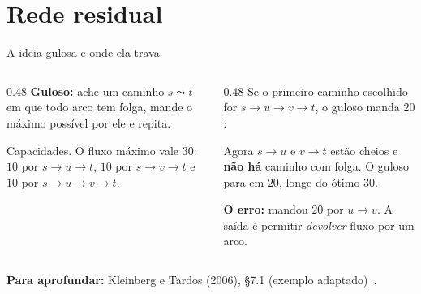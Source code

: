 \documentclass[aspectratio=169,xcolor=table]{beamer}
\newcommand{\nosKT}{%
  \node[vert] (s) at (0,0) {$s$};   \node[vert] (u) at (1.5,0.9) {$u$};
  \node[vert] (v) at (1.5,-0.9) {$v$}; \node[vert] (t) at (3,0) {$t$};
}
\newcommand{\redeKT}[1]{%
  \nosKT
  \foreach \u/\v/\l/\e in {#1} \draw[\e] (\u) to (\v);
  \foreach \u/\v/\l/\e in {#1} \path[\e, draw=none] (\u) to node[peso] {\l} (\v);
}
\newcommand{\fonte}[1]{%
  \vfill
  {\tiny\color{gray!55!black}\textbf{Para aprofundar:} #1\par}%
}
\begin{document}
\section{Rede residual}

\begin{frame}{A ideia gulosa e onde ela trava}
  \begin{columns}[T]
    \begin{column}{0.48\textwidth}
      \textbf{Guloso:} ache um caminho $s \leadsto t$ em que todo arco tem folga, mande o
      máximo possível por ele e repita.
      \medskip
      \begin{center}
      \end{center}
      {\scriptsize Capacidades. O fluxo máximo vale $30$: $10$ por $s \to u \to t$, $10$ por
      $s \to v \to t$ e $10$ por $s \to u \to v \to t$.\par}
    \end{column}
    \begin{column}{0.48\textwidth}
      \scriptsize
      Se o primeiro caminho escolhido for $s \to u \to v \to t$, o guloso manda $20$:
      \begin{center}
      \end{center}
      Agora $s \to u$ e $v \to t$ estão cheios e \textbf{não há} caminho com folga. O guloso
      para em $20$, longe do ótimo $30$.
      \medskip

      \textbf{O erro:} mandou $20$ por $u \to v$. A saída é permitir \emph{devolver} fluxo
      por um arco.
    \end{column}
  \end{columns}
  \fonte{Kleinberg e Tardos (2006), \S 7.1 (exemplo adaptado)~\cite{kleinberg2006algorithm}.}
\end{frame}
\end{document}
